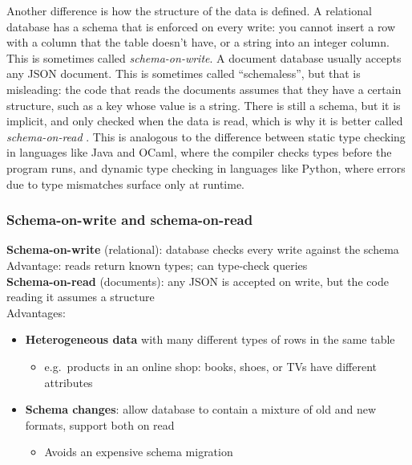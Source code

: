 Another difference is how the structure of the data is defined.
A relational database has a schema that is enforced on every write: you cannot insert a row with a column that the table doesn't have, or a string into an integer column.
This is sometimes called \emph{schema-on-write}.
A document database usually accepts any JSON document.
This is sometimes called ``schemaless'', but that is misleading: the code that reads the documents assumes that they have a certain structure, such as a  key whose value is a string.
There is still a schema, but it is implicit, and only checked when the data is read, which is why it is better called \emph{schema-on-read} \citep{Kleppmann2026}.
This is analogous to the difference between static type checking in languages like Java and OCaml, where the compiler checks types before the program runs, and dynamic type checking in languages like Python, where errors due to type mismatches surface only at runtime.

\begin{frame}
    \label{s:schema-on-read}
    \frametitle{Schema-on-write and schema-on-read}
    \textbf{Schema-on-write} (relational): database checks every write against the schema\\[0.5em]
    Advantage: reads return known types; can type-check queries\\[1em]
    \textbf{Schema-on-read} (documents): any JSON is accepted on write, but the code reading it assumes a structure\\[0.5em]\pause
    Advantages:
    \begin{itemize}
        \item \textbf{Heterogeneous data} with many different types of rows in the same table
            \begin{itemize}
                \item e.g.\ products in an online shop: books, shoes, or TVs have different attributes\\[0.5em]\pause
            \end{itemize}
        \item \textbf{Schema changes}: allow database to contain a mixture of old and new formats, support both on read
            \begin{itemize}
                \item Avoids an expensive schema migration
            \end{itemize}
    \end{itemize}
\end{frame}
\label{l:schema-on-read}

